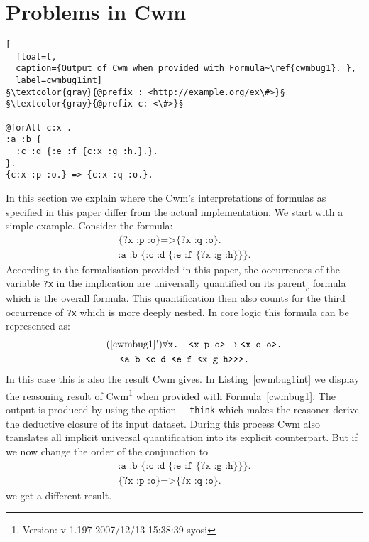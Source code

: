 
 \chapter{Problems in Cwm}\label{bugsincwm}
 \begin{lstlisting}[
  float=t,
  caption={Output of Cwm when provided with Formula~\ref{cwmbug1}. },
  label=cwmbug1int]
§\textcolor{gray}{@prefix : <http://example.org/ex\#>}§
§\textcolor{gray}{@prefix c: <\#>}§
   
@forAll c:x .
:a :b {
  :c :d {:e :f {c:x :g :h.}.}.
}.
{c:x :p :o.} => {c:x :q :o.}.
\end{lstlisting}
In this section we explain where the Cwm's interpretations of \nthree formulas as specified in this paper differ
from the actual implementation. %
We start with a simple example. Consider the formula:  
%
\begin{multline}\label{cwmbug1} 
\texttt{\{?x :p :o\}=>\{?x :q :o\}.}\\
\texttt{:a :b \{:c :d \{:e :f \{?x :g :h\}\}\}.}
\end{multline}
According to the formalisation provided in this paper, the occurrences of the variable \texttt{?x} in the implication  are universally quantified on its
$\text{parent}_c$ formula which is the overall formula.
This quantification then also counts for the third occurrence of \texttt{?x} which is more deeply nested. In core logic this formula can be represented as:
\begin{multline}\tag{\ref{cwmbug1}'}\label{cwmbugint}
 \forall \texttt{x. <x p o>}\rightarrow\texttt{<x q o>.}\\
 \texttt{<a b <c d <e f <x g h>{}>{}>.}
\end{multline}
In this case this is also the result Cwm gives. In Listing~\ref{cwmbug1int} we display the reasoning result of Cwm\footnote{Version: v 1.197 2007/12/13 15:38:39 syosi} when provided with Formula~\ref{cwmbug1}. The output is produced by using the option 
\texttt{-{}-think} which makes the reasoner derive the deductive closure of its input dataset. During this process Cwm also translates all implicit universal quantification into its explicit counterpart.
But if we now change the order of the conjunction to
\begin{multline}\label{cwmbug2}
\texttt{:a :b \{:c :d \{:e :f \{?x :g :h\}\}\}.}\\
\texttt{\{?x :p :o\}=>\{?x :q :o\}.}
\end{multline}
%
we get a different result.
